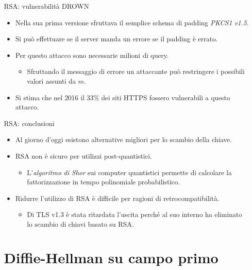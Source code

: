 \documentclass[11pt,svgnames,smaller,aspectratio=169,italian]{beamer}
\begin{document}
\begin{frame}{RSA: vulnerabilità DROWN}
	\begin{itemize}
		\item Nella sua prima versione sfruttava il semplice schema di padding \emph{PKCS1 v1.5}.
		\item Si può effettuare se il server manda un errore se il padding è errato.
		\item Per questo attacco sono necessarie milioni di query.
			\begin{itemize}
				\item Sfruttando il messaggio di errore un attaccante può restringere i possibili valori assunti da $m$.
			\end{itemize}
		\item Si stima che nel 2016 il 33\% dei siti HTTPS fossero vulnerabili a questo attacco.
	\end{itemize}
\end{frame}

\begin{frame}{RSA: conclusioni}
	\begin{itemize}
		\item Al giorno d'oggi esistono alternative migliori per lo scambio della chiave.
		\item RSA non è sicuro per utilizzi post-quantistici.
			\begin{itemize}
				\item L'\emph{algoritmo di Shor} sui computer quantistici permette di calcolare la fattorizzazione in tempo polinomiale probabilistico.
			\end{itemize}
		\item Ridurre l'utilizzo di RSA è difficile per ragioni di retrocompatibilità.
			\begin{itemize}
				\item Di TLS v1.3 è stata ritardata l'uscita perché al suo interno ha eliminato lo scambio di chiavi basato su RSA.
			\end{itemize}
	\end{itemize}
\end{frame}

\section{Diffie-Hellman su campo primo}
\begin{frame}
	\sectionpage
	\centering
\end{frame}
\end{document}
